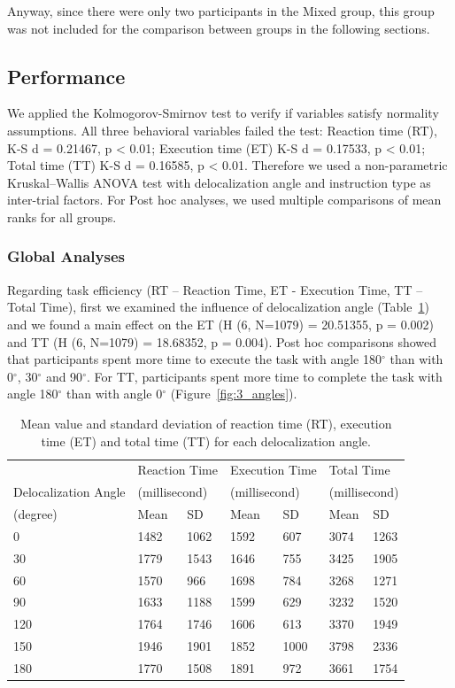 Anyway, since there were only two participants in the Mixed group, this group was not included for the comparison between groups in the following sections.

\subsection{Performance}
We applied the Kolmogorov-Smirnov test to verify if variables satisfy normality assumptions. All three behavioral variables failed the test: Reaction time (RT), K-S d = 0.21467, p \textless{} 0.01; Execution time (ET) K-S d = 0.17533, p \textless{} 0.01; Total time (TT) K-S d = 0.16585, p \textless{} 0.01. Therefore we used a non-parametric Kruskal–Wallis ANOVA test with delocalization angle and instruction type as inter-trial factors. For Post hoc analyses, we used multiple comparisons of mean ranks for all groups.

\subsubsection{Global Analyses}
Regarding task efficiency (RT – Reaction Time, ET - Execution Time, TT – Total Time), first we examined the influence of delocalization angle (Table~\ref{tab:3_angles}) and we found a main effect on the ET (H (6, N=1079) = 20.51355, p = 0.002) and TT (H (6, N=1079) = 18.68352, p = 0.004). Post hoc comparisons showed that participants spent more time to execute the task with angle 180$^{\circ}$ than with 0$^{\circ}$, 30$^{\circ}$ and 90$^{\circ}$. For TT, participants spent more time to complete the task with angle 180$^{\circ}$ than with angle 0$^{\circ}$ (Figure~\ref{fig:3_angles}).

\begin{table}[!t]
\renewcommand{\arraystretch}{1.3}
\caption{Mean value and standard deviation of reaction time (RT), execution time (ET) and total time (TT) for each delocalization angle.}
\label{tab:3_angles}
\centering
\begin{tabular}{p{2.5cm} l l l l l l}
  \hline
     & \multicolumn{2}{p{3cm}}{Reaction Time} & \multicolumn{2}{p{3cm}}{Execution Time} & \multicolumn{2}{p{3cm}}{Total Time} \\
     Delocalization Angle & \multicolumn{2}{p{2.5cm}}{(millisecond)} & \multicolumn{2}{p{2.5cm}}{(millisecond)} & \multicolumn{2}{p{2.5cm}}{(millisecond)} \\
    (degree) & Mean & SD & Mean & SD & Mean & SD \\
    \hline
    0 & 1482 & 1062 & 1592 & 607 & 3074 & 1263 \\
    30 & 1779 & 1543 & 1646 & 755 & 3425 & 1905 \\
  60 & 1570 & 966 & 1698 & 784 & 3268 & 1271 \\
  90 & 1633 & 1188 & 1599 & 629 & 3232 & 1520 \\
  120 & 1764 & 1746 & 1606 & 613 & 3370 & 1949 \\
  150 & 1946 & 1901 & 1852 & 1000 & 3798 & 2336 \\
  180 & 1770 & 1508 & 1891 & 972 & 3661 & 1754 \\ \hline
\end{tabular}
\end{table}

